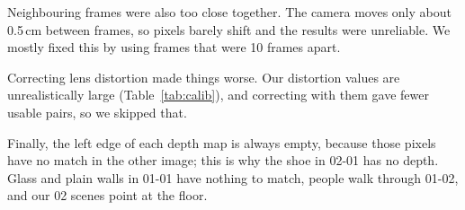 Neighbouring frames were also too close together. The camera moves only about 0.5\,cm between frames, so
pixels barely shift and the results were unreliable. We mostly fixed this by using frames that were 10 frames apart.

Correcting lens distortion made things worse. Our distortion values are unrealistically large
(Table~\ref{tab:calib}), and correcting with them gave fewer usable pairs, so we skipped that.

Finally, the left edge of each depth map is always empty, because those pixels have no
match in the other image; this is why the shoe in 02-01 has no depth. Glass and plain walls in 01-01
have nothing to match, people walk through 01-02, and our 02 scenes point at the floor.
